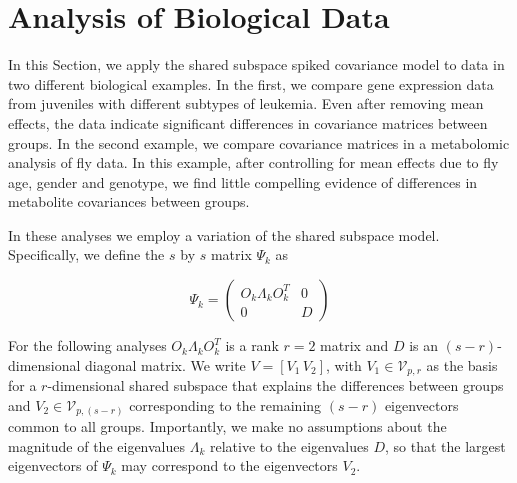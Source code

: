 \documentclass[12pt]{article}
\begin{document}


\section{Analysis of Biological Data}
\label{sec:app}

In this Section, we apply the shared subspace spiked covariance model to data in two
different biological examples.  In the first, we compare gene
expression data from juveniles with different subtypes of leukemia.  Even
after removing mean effects, the data indicate significant differences
in covariance matrices between groups.  In the second example, we
compare covariance matrices in a metabolomic analysis of fly data.  In
this example, after controlling for mean effects due to fly age, gender and
genotype, we find little compelling evidence of differences in metabolite
covariances between groups. 

In these analyses we employ a variation of the shared
subspace model.  Specifically, we define the $s$ by $s$ matrix $\Psi_k$ as

\begin{equation}
\Psi_k =\left( \begin{array}{cc}
O_k\Lambda_kO_k^T & 0  \\
0 & D  \end{array} \right)
\end{equation}

For the following analyses $O_k\Lambda_kO_k^T$ is a rank $r=2$ matrix
and $D$ is an $(s-r)$-dimensional diagonal matrix.  We write
$V = [V_1\, V_2]$, with $V_1 \in \mathcal{V}_{p,r}$ as the basis for a
$r$-dimensional shared subspace that explains the differences between
groups and $V_2 \in \mathcal{V}_{p,(s-r)}$ corresponding to the remaining $(s-r)$
eigenvectors common to all groups.  Importantly, we make no assumptions about the
magnitude of the eigenvalues $\Lambda_k$ relative to the eigenvalues
$D$, so that the largest eigenvectors of $\Psi_k$ may correspond to
the eigenvectors $V_2$.  
\end{document}
